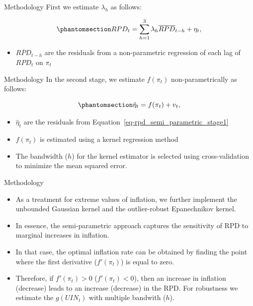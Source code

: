 \documentclass[
  ignorenonframetext,
]{beamer}
\providecommand{\tightlist}{%
  \setlength{\itemsep}{0pt}\setlength{\parskip}{0pt}}\usepackage{longtable,booktabs,array}
\begin{document}
\begin{frame}{Methodology}
\label{methodology-6}
First we estimate \(\lambda_h\) as follows:

\begin{equation}\phantomsection\label{eq-rpd_semi_parametric_stage1}{ RPD_t = \sum_{h=1}^{3}\lambda_h\overline{RPD}_{t-h} + \eta_t, }\end{equation}

\begin{itemize}
\tightlist
\item
  \(\overline{RPD}_{t-h}\) are the residuals from a non-parametric
  regression of each lag of \(RPD_t\) on \(\pi_t\)
\end{itemize}
\end{frame}

\begin{frame}{Methodology}
\label{methodology-7}
In the second stage, we estimate \(f(\pi_t)\) non-parametrically as
follows:

\begin{equation}\phantomsection\label{eq-rpd_semi_parametric_stage2}{\hat{\eta}_t = f(\pi_t) + v_t, }\end{equation}

\begin{itemize}
\tightlist
\item
  \(\hat{\eta}_t\) are the residuals from
  Equation~\ref{eq-rpd_semi_parametric_stage1}
\item
  \(f(\pi_t)\) is estimated using a kernel regression method
\item
  The bandwidth (\(h\)) for the kernel estimator is selected using
  cross-validation to minimize the mean squared error.
\end{itemize}
\end{frame}

\begin{frame}{Methodology}
\label{methodology-8}
\begin{itemize}
\tightlist
\item
  As a treatment for extreme values of inflation, we further implement
  the unbounded Gaussian kernel and the outlier-robust Epanechnikov
  kernel.
\item
  In essence, the semi-parametric approach captures the sensitivity of
  RPD to marginal increases in inflation.
\item
  In that case, the optimal inflation rate can be obtained by finding
  the point where the first derivative (\(f'(\pi_t)\)) is equal to zero.
\item
  Therefore, if \(f'(\pi_t) > 0\) (\(f'(\pi_t) < 0\)), then an increase
  in inflation (decrease) leads to an increase (decrease) in the RPD.
  For robustness we estimate the \(g(UIN_t)\) with multiple bandwith
  (\(h\)).
\end{itemize}
\end{frame}
\end{document}
